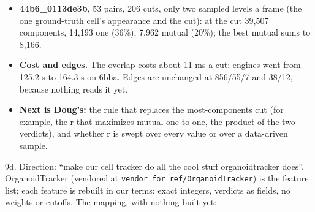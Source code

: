 \begin{itemize}
\begin{itemize}
\item at the earlier frame's cut: 61,679 components, 15,979 overlap exactly one (26\%), and \textbf{6,688 mutual (11\%)};
\item the best mutual over each pair's sampled cuts sums to \textbf{13,783} (139 a pair, against 68 at the cut);
\item frame 0→1 at level 1,045,988: 204 components, 167 one, \textbf{144 mutual}. At the cut, level 84,314: 329 components, 83 one, 29 mutual;
\item the mutual count peaks high in the tree (codes about 1.0 to 1.1M of about 1.1M), at 150 to 200 components a frame, where 70–80\% of the components are mutual. The most-components cut sits low, where 10–30\% are.
\end{itemize}
\item \textbf{44b6\_\allowbreak{}0113de3b}, 53 pairs, 206 cuts, only two sampled levels a frame (the one ground-truth cell's appearance and the cut): at the cut 39,507 components, 14,193 one (36\%), 7,962 mutual (20\%); the best mutual sums to 8,166.
\item \textbf{Cost and edges.} The overlap costs about 11 ms a cut: engines went from 125.2 s to 164.3 s on 6bba. Edges are unchanged at 856/55/7 and 38/12, because nothing reads it yet.
\item \textbf{Next is Doug's:} the rule that replaces the most-components cut (for example, the r that maximizes mutual one-to-one, the product of the two verdicts), and whether r is swept over every value or over a data-driven sample.
\end{itemize}

9d. Direction: “make our cell tracker do all the cool stuff organoidtracker does”. OrganoidTracker (vendored at \texttt{vendor\_\allowbreak{}for\_\allowbreak{}ref/\allowbreak{}Organoid\allowbreak{}Tracker}) is the feature list; each feature is rebuilt in our terms: exact integers, verdicts as fields, no weights or cutoffs. The mapping, with nothing built yet:

